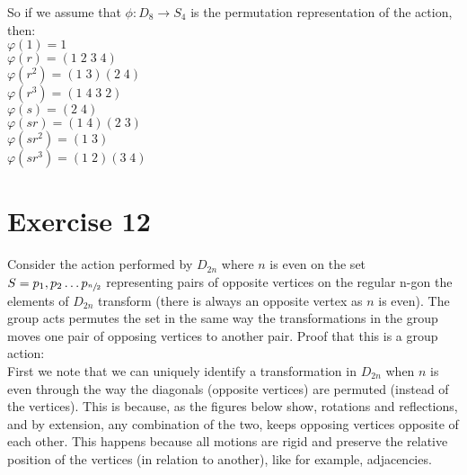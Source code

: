 \documentclass{article}
\begin{document}
    So if we assume that $\phi: D_8 \to S_4$ is the permutation
    representation of the action, then: \\
    $\varphi(1) = 1$ \\
    $\varphi(r) = (1\;2\;3\;4)$ \\
    $\varphi(r^2) = (1\;3)(2\;4)$ \\
    $\varphi(r^3) = (1\;4\;3\;2)$ \\
    $\varphi(s) = (2\;4)$ \\
    $\varphi(sr) = (1\;4)(2\;3)$ \\
    $\varphi(sr^2) = (1\;3)$ \\
    $\varphi(sr^3) = (1\;2)(3\;4)$ \\


    \section*{Exercise 12}
    Consider the action performed by $D_{2n}$ where $n$ is even
    on the set $S = {p_1, p_2 \dots p_{\sfrac{n}{2}}}$
    representing pairs of opposite vertices on the regular n-gon
    the elements of $D_{2n}$ transform
    (there is always an opposite vertex as $n$ is even).
    The group acts permutes the set in the same way the transformations
    in the group moves one pair of opposing vertices to another pair.
    Proof that this is a group action: \\
    First we note that we can uniquely identify a transformation
    in $D_{2n}$ when $n$ is even through the way the diagonals
    (opposite vertices)
    are permuted (instead of the vertices).
    This is because, as the figures below show,
    rotations and reflections, and by extension, any combination
    of the two,
    keeps opposing vertices opposite of each other.
    This happens because all motions are rigid and preserve
    the relative position of the vertices (in relation to another),
    like for example, adjacencies.
\end{document}
